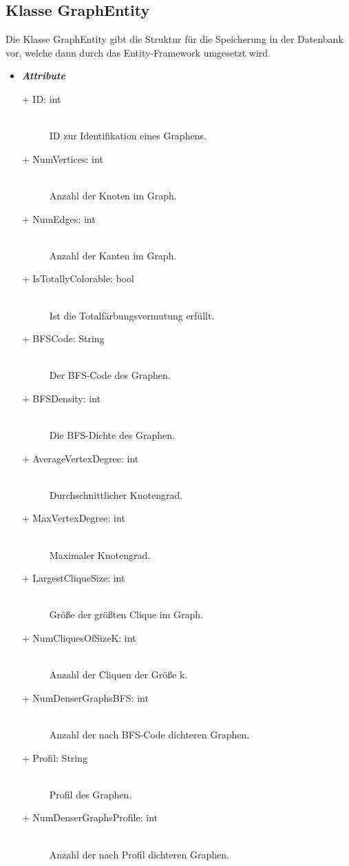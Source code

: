 \documentclass[13pt]{scrreprt}
\begin{document}
	\subsection{Klasse GraphEntity}
	Die Klasse GraphEntity gibt die Struktur für die Speicherung in der Datenbank vor, welche dann durch das Entity-Framework umgesetzt wird.
	\begin{itemize}[label = {$\circ$}]
		\item {\large \textbf{\textit{Attribute}}\par}
		\begin{description}
			\item [+ ID: int] \hfill \\ ID zur Identifikation eines Graphens.
			\item [+ NumVertices: int] \hfill \\ Anzahl der Knoten im Graph.
			\item [+ NumEdges: int] \hfill \\ Anzahl der Kanten im Graph.
			\item [+ IsTotallyColorable: bool] \hfill \\ Ist die Totalf\"arbungsvermutung erfüllt.
			\item [+ BFSCode: String] \hfill \\ Der BFS-Code des Graphen.
			\item [+ BFSDensity: int] \hfill \\ Die BFS-Dichte des Graphen.
			\item [+ AverageVertexDegree: int] \hfill \\ Durchschnittlicher Knotengrad.
			\item [+ MaxVertexDegree: int] \hfill \\Maximaler Knotengrad.
			\item [+ LargestCliqueSize: int] \hfill \\ Größe der größten Clique im Graph.
			\item [+ NumCliquesOfSizeK: int] \hfill \\ Anzahl der Cliquen der Größe k.
			\item [+ NumDenserGraphsBFS: int] \hfill \\ Anzahl der nach BFS-Code dichteren Graphen.
			\item [+ Profil: String] \hfill \\ Profil des Graphen.
			\item [+ NumDenserGraphsProfile: int] \hfill \\ Anzahl der nach Profil dichteren Graphen.

\end{description}
\end{itemize}
\end{document}
